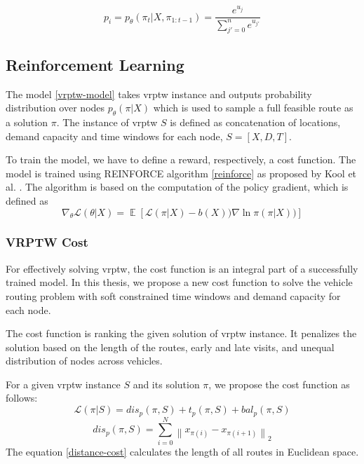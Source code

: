     \begin{equation}\label{encoder-attention-score}
        p_i = p_{\theta}(\pi_t|X, \pi_{1:t-1}) = \dfrac{e^{u_j}}{\sum_{j'=0}^n e^{u_{j'}}}
    \end{equation}
    
    \subsection{Reinforcement Learning}\label{vrptw-rl}
    The model \ref{vrptw-model} takes \gls{vrptw} instance and outputs probability distribution over nodes $p_{\theta}(\pi|X)$ which is used to sample a full feasible route as a solution $\pi$. The instance of \gls{vrptw} $S$ is defined as concatenation of locations, demand capacity and time windows for each node, $S = [X, D, T]$.
    
    To train the model, we have to define a reward, respectively, a cost function. The model is trained using REINFORCE algorithm \ref{reinforce} as proposed by Kool et al. \cite{attention-route}. The algorithm is based on the computation of the policy gradient, which is defined as
    \begin{equation}\label{encoder-attention-score}
        \nabla_{\theta} \mathcal{L}(\theta|X) = \mathop{\mathbb{E}}[ \mathcal{L}(\pi|X) - b(X)) \nabla \ln \pi (\pi|X))]
    \end{equation}
    
        \subsubsection{VRPTW Cost}\label{vrptw-rl}
        For effectively solving \gls{vrptw}, the cost function is an integral part of a successfully trained model. In this thesis, we propose a new cost function to solve the vehicle routing problem with soft constrained time windows and demand capacity for each node.
        
        The cost function is ranking the given solution of \gls{vrptw} instance. It penalizes the solution based on the length of the routes, early and late visits, and unequal distribution of nodes across vehicles.
        
        For a given \gls{vrptw} instance $S$ and its solution $\pi$, we propose the cost function as follows:
        \newcommand{\norm}[1]{\left\lVert#1\right\rVert}
        \begin{equation}\label{vrptw-cost}
            \mathcal{L}(\pi|S) = dis_p(\pi, S) + t_p(\pi, S) + bal_p(\pi, S)
        \end{equation}
        \begin{equation}\label{distance-cost}
            dis_p(\pi, S) = \sum_{i=0}^N \norm{x_{\pi(i)} - x_{\pi(i+1)}}_2
        \end{equation}
        The equation \ref{distance-cost} calculates the length of all routes in Euclidean space.
        
